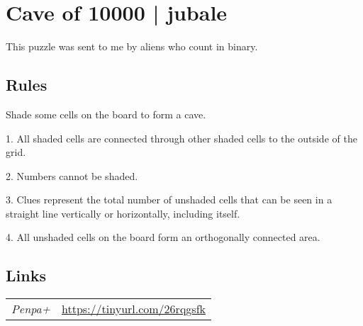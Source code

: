\section[Cave of 10000 | jubale {[\emph{Cave}]}]{Cave of 10000 | {\normalfont jubale}}
\label{sec:58-cave-of-10000-jubale}
This puzzle was sent to me by aliens who count in binary.
\subsection*{Rules}
\begin{markdown}
Shade some cells on the board to form a cave.



1. All shaded cells are connected through other shaded cells to the outside of the grid.



2. Numbers cannot be shaded.



3. Clues represent the total number of unshaded cells that can be seen in a straight line vertically or horizontally, including itself.



4. All unshaded cells on the board form an orthogonally connected area.
\end{markdown}
\subsection*{Links}
\begin{tabularx}{\textwidth}{l X}
\emph{Penpa+} & \url{https://tinyurl.com/26rqgsfk} \\
\end{tabularx}
\pagebreak
